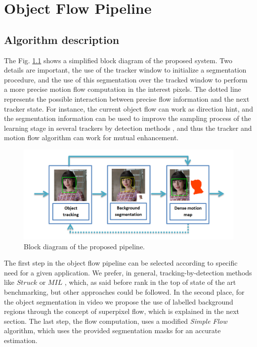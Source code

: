 
\chapter{Object Flow Pipeline} \label{chap:core}

\section{Algorithm description}
\label{sec:desc}

The Fig. \ref{figurelabel_sys} shows a simplified block diagram of the proposed system. Two details are important, 
the use of the tracker window to initialize a segmentation procedure, and the use of this segmentation over the tracked window 
to perform a more precise motion flow computation in the interest pixels. The dotted line represents the possible interaction 
between precise flow information and the next tracker state. For instance, the current object flow can work as direction hint, and 
the segmentation information can be used to improve the sampling process of the learning stage in several trackers by detection methods \cite{c22}, and 
thus the tracker and motion flow algorithm can work for mutual enhancement.

   \begin{figure}[thpb]
      \centering
      \includegraphics[width=1.00\textwidth]{../images/system.png}
      \caption{Block diagram of the proposed pipeline.}
      \label{figurelabel_sys}
   \end{figure}

The first step in the object flow pipeline can be selected according to specific need for a given application. We prefer, in general, tracking-by-detection methods 
like $Struck$ \cite{c22} or $MIL$ \cite{c23}, which, as said before rank in the top of state of the art benchmarking, but other approaches could be followed. In the second place, for the object segmentation in video we propose the use 
of labelled background regions through the concept of superpixel flow, which is explained in the next section. The last step, the flow computation, uses a modified 
{\it Simple Flow} algorithm, which uses the provided segmentation masks for an accurate estimation.




